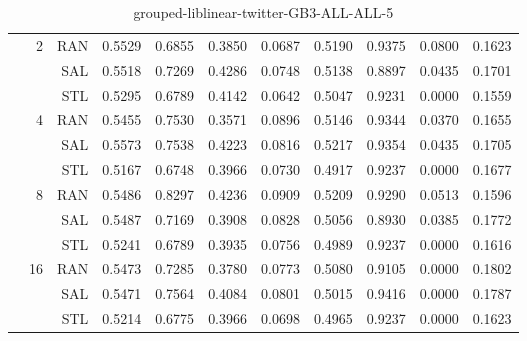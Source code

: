 \begin{center}
\begin{table}[htbp]
\begin{tabular}{ | r | r | r | r | r | r | r | r | r | r | r |}
 & \multirow{3}{*}{2} & RAN & 0.5529 & 0.6855 & 0.3850 & 0.0687 & 0.5190 & 0.9375 & 0.0800 & 0.1623\\ \cline{3-11}
 &   & SAL & 0.5518 & 0.7269 & 0.4286 & 0.0748 & 0.5138 & 0.8897 & 0.0435 & 0.1701\\ \cline{3-11}
 &   & STL & 0.5295 & 0.6789 & 0.4142 & 0.0642 & 0.5047 & 0.9231 & 0.0000 & 0.1559\\ \cline{2-11}
 & \multirow{3}{*}{4} & RAN & 0.5455 & 0.7530 & 0.3571 & 0.0896 & 0.5146 & 0.9344 & 0.0370 & 0.1655\\ \cline{3-11}
 &   & SAL & 0.5573 & 0.7538 & 0.4223 & 0.0816 & 0.5217 & 0.9354 & 0.0435 & 0.1705\\ \cline{3-11}
 &   & STL & 0.5167 & 0.6748 & 0.3966 & 0.0730 & 0.4917 & 0.9237 & 0.0000 & 0.1677\\ \cline{2-11}
 & \multirow{3}{*}{8} & RAN & 0.5486 & 0.8297 & 0.4236 & 0.0909 & 0.5209 & 0.9290 & 0.0513 & 0.1596\\ \cline{3-11}
 &   & SAL & 0.5487 & 0.7169 & 0.3908 & 0.0828 & 0.5056 & 0.8930 & 0.0385 & 0.1772\\ \cline{3-11}
 &   & STL & 0.5241 & 0.6789 & 0.3935 & 0.0756 & 0.4989 & 0.9237 & 0.0000 & 0.1616\\ \cline{2-11}
 & \multirow{3}{*}{16} & RAN & 0.5473 & 0.7285 & 0.3780 & 0.0773 & 0.5080 & 0.9105 & 0.0000 & 0.1802\\ \cline{3-11}
 &   & SAL & 0.5471 & 0.7564 & 0.4084 & 0.0801 & 0.5015 & 0.9416 & 0.0000 & 0.1787\\ \cline{3-11}
 &   & STL & 0.5214 & 0.6775 & 0.3966 & 0.0698 & 0.4965 & 0.9237 & 0.0000 & 0.1623\\ \cline{2-11}
\hline
\end{tabular}
\caption{grouped-liblinear-twitter-GB3-ALL-ALL-5}
\end{table}
\end{center}

